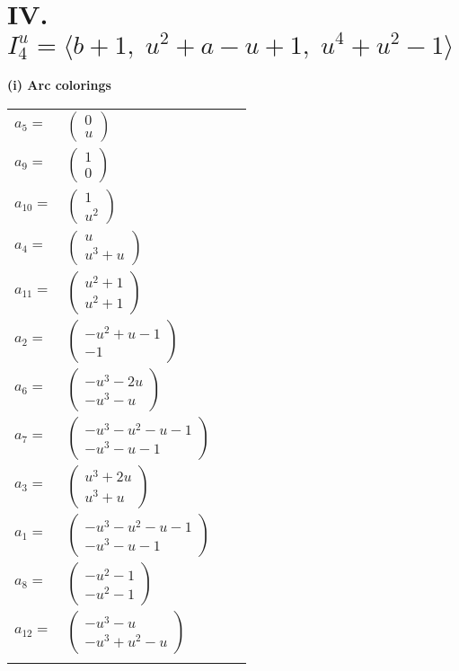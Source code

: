 \documentclass[1p]{elsarticle_modified}
\theoremstyle{definition}
\begin{document}
\centering \section*{IV. $I^u_{4}= \langle b+1,\;u^2+a- u+1,\;u^4+u^2-1 \rangle$}
\flushleft \textbf{(i) Arc colorings}\\
\begin{tabular}{m{7pt} m{180pt} m{7pt} m{180pt} }
\flushright $a_{5}=$&$\begin{pmatrix}0\\u\end{pmatrix}$ \\
\flushright $a_{9}=$&$\begin{pmatrix}1\\0\end{pmatrix}$ \\
\flushright $a_{10}=$&$\begin{pmatrix}1\\u^2\end{pmatrix}$ \\
\flushright $a_{4}=$&$\begin{pmatrix}u\\u^3+u\end{pmatrix}$ \\
\flushright $a_{11}=$&$\begin{pmatrix}u^2+1\\u^2+1\end{pmatrix}$ \\
\flushright $a_{2}=$&$\begin{pmatrix}- u^2+u-1\\-1\end{pmatrix}$ \\
\flushright $a_{6}=$&$\begin{pmatrix}- u^3-2 u\\- u^3- u\end{pmatrix}$ \\
\flushright $a_{7}=$&$\begin{pmatrix}- u^3- u^2- u-1\\- u^3- u-1\end{pmatrix}$ \\
\flushright $a_{3}=$&$\begin{pmatrix}u^3+2 u\\u^3+u\end{pmatrix}$ \\
\flushright $a_{1}=$&$\begin{pmatrix}- u^3- u^2- u-1\\- u^3- u-1\end{pmatrix}$ \\
\flushright $a_{8}=$&$\begin{pmatrix}- u^2-1\\- u^2-1\end{pmatrix}$ \\
\flushright $a_{12}=$&$\begin{pmatrix}- u^3- u\\- u^3+u^2- u\end{pmatrix}$\\&\end{tabular}
\end{document}
